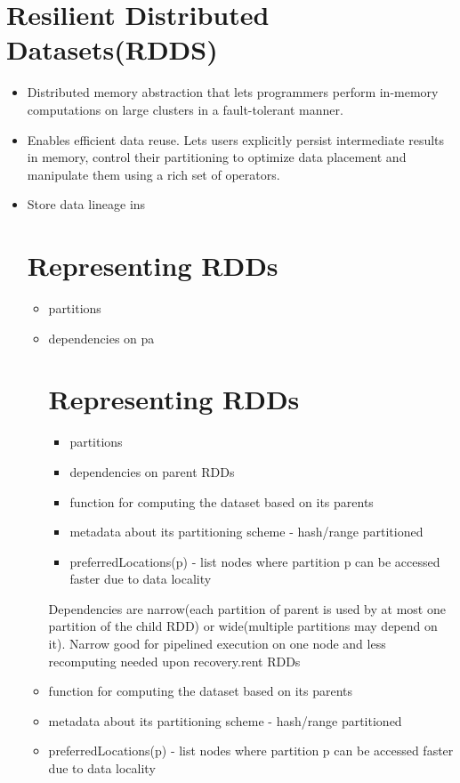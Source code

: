 \section{Resilient Distributed Datasets(RDDS)}
\begin{itemize}
    \item Distributed memory abstraction that lets programmers perform in-memory computations on large clusters in a fault-tolerant manner.
    \item Enables efficient data reuse. Lets users explicitly persist intermediate results in memory, control their partitioning to optimize data placement and manipulate them using a rich set of operators.
    \item Store data lineage ins\section{Representing RDDs}
    \begin{itemize}
        \item partitions
        \item dependencies on pa\section{Representing RDDs}
        \begin{itemize}
            \item partitions
            \item dependencies on parent RDDs
            \item function for computing the dataset based on its parents
            \item metadata about its partitioning scheme - hash/range partitioned
            \item preferredLocations(p) - list nodes where partition p can be accessed faster due to data locality
            
        \end{itemize}
        Dependencies are narrow(each partition of parent is used by at most one partition of the child RDD) or wide(multiple partitions may depend on it).
        Narrow good for pipelined execution on one node and less recomputing needed upon recovery.rent RDDs
        \item function for computing the dataset based on its parents
        \item metadata about its partitioning scheme - hash/range partitioned
        \item preferredLocations(p) - list nodes where partition p can be accessed faster due to data locality
        

\end{itemize}
\end{itemize}

